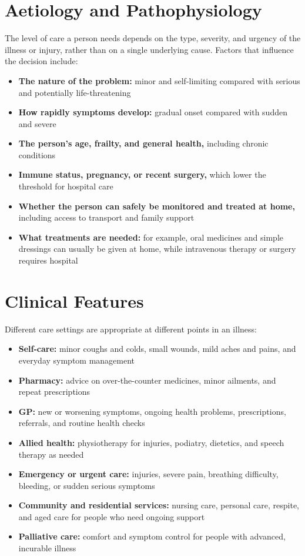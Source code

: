 \section*{Aetiology and Pathophysiology}
The level of care a person needs depends on the type, severity, and urgency of the illness or injury, rather than on a single underlying cause. Factors that influence the decision include:
\begin{itemize}
    \item \textbf{The nature of the problem:} minor and self-limiting compared with serious and potentially life-threatening
    \item \textbf{How rapidly symptoms develop:} gradual onset compared with sudden and severe
    \item \textbf{The person's age, frailty, and general health,} including chronic conditions
    \item \textbf{Immune status, pregnancy, or recent surgery,} which lower the threshold for hospital care
    \item \textbf{Whether the person can safely be monitored and treated at home,} including access to transport and family support
    \item \textbf{What treatments are needed:} for example, oral medicines and simple dressings can usually be given at home, while intravenous therapy or surgery requires hospital
\end{itemize}

\section*{Clinical Features}
Different care settings are appropriate at different points in an illness:
\begin{itemize}
    \item \textbf{Self-care:} minor coughs and colds, small wounds, mild aches and pains, and everyday symptom management
    \item \textbf{Pharmacy:} advice on over-the-counter medicines, minor ailments, and repeat prescriptions
    \item \textbf{GP:} new or worsening symptoms, ongoing health problems, prescriptions, referrals, and routine health checks
    \item \textbf{Allied health:} physiotherapy for injuries, podiatry, dietetics, and speech therapy as needed
    \item \textbf{Emergency or urgent care:} injuries, severe pain, breathing difficulty, bleeding, or sudden serious symptoms
    \item \textbf{Community and residential services:} nursing care, personal care, respite, and aged care for people who need ongoing support
    \item \textbf{Palliative care:} comfort and symptom control for people with advanced, incurable illness
\end{itemize}

